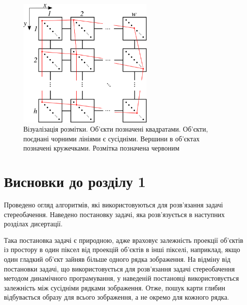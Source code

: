 \begin{figure}[h]
  \centering
  \includegraphics[width=0.6\textwidth]{images/labeling}
  \caption{Візуалізація розмітки.
           Об'єкти позначені квадратами.
           Об'єкти, поєднані чорними лініями є сусідніми.
           Вершини в об'єктах позначені кружечками.
           Розмітка позначена червоним}
  \label{fig:labeling}
\end{figure}

\section*{Висновки до розділу 1}

Проведено огляд алгоритмів,
які використовуються для розв'язання задачі стереобачення.
Наведено постановку задачі,
яка розв'язується в наступних розділах дисертації.

Така постановка задачі є природною,
адже враховує залежність проекції об'єктів із простору
в один піксел від проекцій об'єктів в інші пікселі,
наприклад, якщо один гладкий об'єкт зайняв більше одного рядка зображення.
На відміну від постановки задачі,
що використовується для
розв'язання задачі стереобачення методом динамічного програмування,
у наведеній постановці використовується залежність між сусідніми рядками
зображення.
Отже, пошук карти глибин відбувається образу для всього зображення,
а не окремо для кожного рядка.
